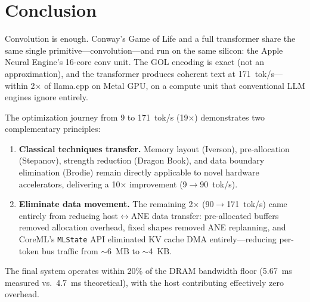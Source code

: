 \documentclass[11pt,twocolumn]{article}
\begin{document}
\section{Conclusion}

Convolution is enough. Conway's Game of Life and a full transformer
share the same single primitive---convolution---and run on the same
silicon: the Apple Neural Engine's 16-core conv unit. The GOL encoding
is exact (not an approximation), and the transformer produces coherent
text at 171~tok/s---within 2$\times$ of llama.cpp on Metal GPU, on a
compute unit that conventional LLM engines ignore entirely.

The optimization journey from 9 to 171~tok/s (19$\times$) demonstrates
two complementary principles:
\begin{enumerate}
\item \textbf{Classical techniques transfer.} Memory layout (Iverson),
  pre-allocation (Stepanov), strength reduction (Dragon Book), and
  data boundary elimination (Brodie) remain directly applicable to
  novel hardware accelerators, delivering a 10$\times$ improvement
  (9$\to$90~tok/s).
\item \textbf{Eliminate data movement.} The remaining 2$\times$
  (90$\to$171~tok/s) came entirely from reducing host$\leftrightarrow$ANE
  data transfer: pre-allocated buffers removed allocation overhead,
  fixed shapes removed ANE replanning, and CoreML's \texttt{MLState}
  API eliminated KV cache DMA entirely---reducing per-token bus
  traffic from $\sim$6~MB to $\sim$4~KB.
\end{enumerate}

The final system operates within 20\% of the DRAM bandwidth floor
(5.67~ms measured vs.\ 4.7~ms theoretical), with the host contributing
effectively zero overhead.
\end{document}
